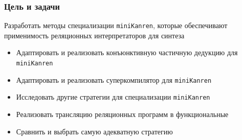\documentclass{beamer}
\newcommand{\miniKanren}{\texttt{miniKanren}}
\begin{document}
\begin{frame}[fragile]
  \transwipe[direction=90]
  \frametitle{Цель и задачи}

\begin{center}
  Разработать методы специализации \miniKanren, которые обеспечивают применимость реляционных интерпретаторов для синтеза
\end{center}

\begin{itemize}
  \item Адаптировать и реализовать конъюнктивную частичную дедукцию для \miniKanren
  \item Адаптировать и реализовать суперкомпилятор для \miniKanren
  \item Исследовать другие стратегии для специализации \miniKanren
  \item Реализовать трансляцию реляционных программ в функциональные 
  \item Сравнить и выбрать самую адекватную стратегию
\end{itemize}
\end{frame}
\end{document}
